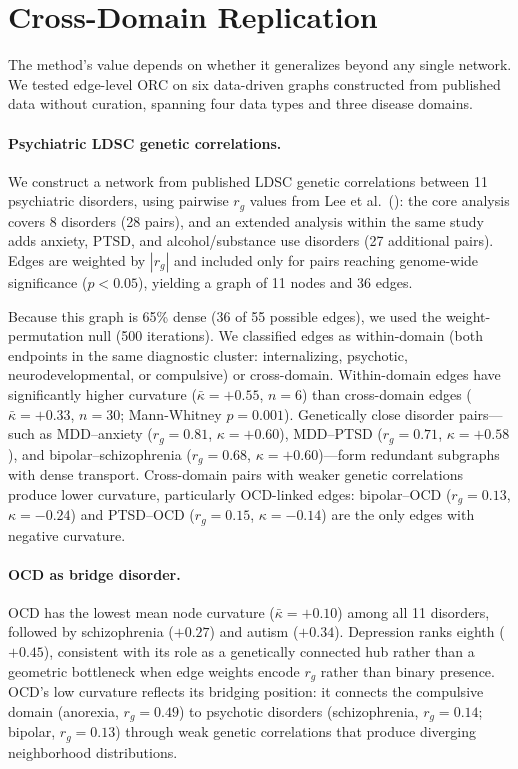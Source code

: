 \documentclass[11pt]{article}
\begin{document}
\section{Cross-Domain Replication}
\label{sec:replication}

The method's value depends on whether it generalizes beyond any single network. We tested edge-level ORC on six data-driven graphs constructed from published data without curation, spanning four data types and three disease domains.

\paragraph{Psychiatric LDSC genetic correlations.} We construct a network from published LDSC genetic correlations \citep{buliksullivan2015ld} between 11 psychiatric disorders, using pairwise $r_g$ values from Lee et al.\ (\citeyear{lee2022genetic}): the core analysis covers 8 disorders (28 pairs), and an extended analysis within the same study adds anxiety, PTSD, and alcohol/substance use disorders (27 additional pairs). Edges are weighted by $|r_g|$ and included only for pairs reaching genome-wide significance ($p < 0.05$), yielding a graph of 11 nodes and 36 edges.

Because this graph is 65\% dense (36 of 55 possible edges), we used the weight-permutation null (500 iterations). We classified edges as within-domain (both endpoints in the same diagnostic cluster: internalizing, psychotic, neurodevelopmental, or compulsive) or cross-domain. Within-domain edges have significantly higher curvature ($\bar{\kappa} = +0.55$, $n = 6$) than cross-domain edges ($\bar{\kappa} = +0.33$, $n = 30$; Mann-Whitney $p = 0.001$). Genetically close disorder pairs---such as MDD--anxiety ($r_g = 0.81$, $\kappa = +0.60$), MDD--PTSD ($r_g = 0.71$, $\kappa = +0.58$), and bipolar--schizophrenia ($r_g = 0.68$, $\kappa = +0.60$)---form redundant subgraphs with dense transport. Cross-domain pairs with weaker genetic correlations produce lower curvature, particularly OCD-linked edges: bipolar--OCD ($r_g = 0.13$, $\kappa = -0.24$) and PTSD--OCD ($r_g = 0.15$, $\kappa = -0.14$) are the only edges with negative curvature.

\paragraph{OCD as bridge disorder.} OCD has the lowest mean node curvature ($\bar{\kappa} = +0.10$) among all 11 disorders, followed by schizophrenia ($+0.27$) and autism ($+0.34$). Depression ranks eighth ($+0.45$), consistent with its role as a genetically connected hub rather than a geometric bottleneck when edge weights encode $r_g$ rather than binary presence. OCD's low curvature reflects its bridging position: it connects the compulsive domain (anorexia, $r_g = 0.49$) to psychotic disorders (schizophrenia, $r_g = 0.14$; bipolar, $r_g = 0.13$) through weak genetic correlations that produce diverging neighborhood distributions.
\end{document}
